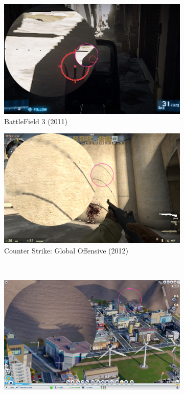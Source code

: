 \begin{figure}[H]
\begin{subfigure}{.5\textwidth}
  \centering
  \includegraphics[width=0.9\linewidth]{images/SMExBF3.jpg}
  \caption{BattleField 3 (2011)}
  \label{fig:SMExBF3}
\end{subfigure}%
\begin{subfigure}{.5\textwidth}
  \centering
  \includegraphics[width=0.9\linewidth]{images/SMExCSGO.jpg}
  \caption{Counter Strike: Global Offensive (2012)}
  \label{fig:SMExCSGO}
\end{subfigure}
\\
\begin{subfigure}{.5\textwidth}
  \centering
  \includegraphics[width=0.9\linewidth]{images/SMExSimCity.jpg}

\end{subfigure}
\end{figure}
